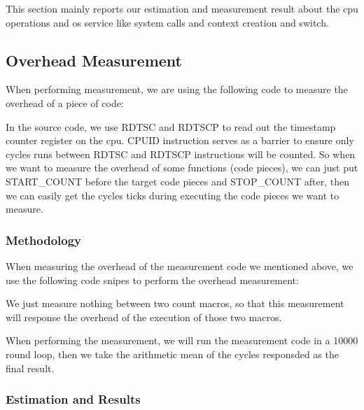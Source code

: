 
This section mainly reports our estimation and measurement result about the cpu operations and os service like system calls and context creation and switch.


\subsection{Overhead Measurement}
When performing measurement, we are using the following code to measure the overhead of a piece of code:



In the source code, we use RDTSC and RDTSCP to read out the timestamp counter register on the cpu. CPUID instruction serves as a barrier to ensure only cycles
runs between RDTSC and RDTSCP instructions will be counted. So when we want to measure the overhead of some functions (code pieces), we can just put START\_COUNT
before the target code pieces and STOP\_COUNT after, then we can easily get the cycles ticks during executing the code pieces we want to measure.


\subsubsection{Methodology}
When measuring the overhead of the measurement code we mentioned above, we use the following code snipes to perform the overhead measurement:



We just measure nothing between two count macros, so that this measurement will response the overhead of the execution of those two macros.

When performing the measurement, we will run the measurement code in a 10000 round loop, then we take the arithmetic mean of the cycles responsded as the final result.


\subsubsection{Estimation and Results}
\label{overhead_estimation}

